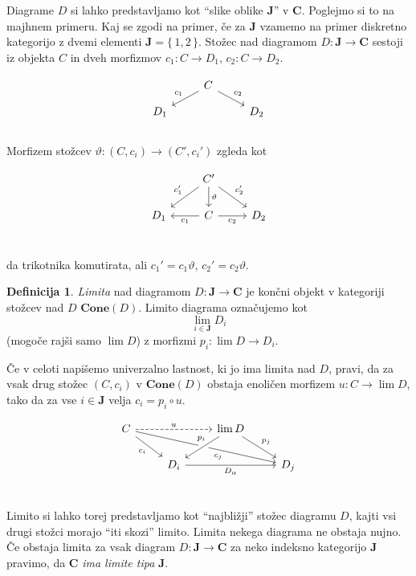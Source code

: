 \documentclass[12pt,a4paper]{book}
\theoremstyle{definition}
\newtheorem{definicija}{Definicija}[chapter]
\theoremstyle{plain}
\theoremstyle{definition}
\theoremstyle{remark}
\newcommand{\cat}[1]{\textbf{#1}}
\renewcommand{\set}[1]{\{\,#1\,\}}
\begin{document}
Diagrame $D$ si lahko predstavljamo kot "`slike oblike $\cat{J}$"' v $\cat{C}$. Poglejmo si to na majhnem primeru. Kaj se zgodi na primer, če za $\cat{J}$ vzamemo na primer diskretno kategorijo z dvemi elementi $\cat{J} = \set{1,2}$. Stožec nad diagramom $D : \cat{J} \to \cat{C}$ sestoji iz objekta $C$ in dveh morfizmov $c_1 : C \to D_1$, $c_2 : C \to D_2$.

$$\begin{tikzcd}[column sep=normal, row sep=small]
& C \ar[dl, "c_1"'] \ar[dr, "c_2"] & \\
D_1 && D_2 \\
\end{tikzcd}$$

Morfizem stožcev $\vartheta : (C,c_i) \to (C', c_i')$ zgleda kot 

$$\begin{tikzcd}
& C' \ar[dl, "c_1'"'] \ar[d, "\vartheta"] \ar[dr, "c_2'"] & \\
D_1 & C \ar[l, "c_1"] \ar[r, "c_2"'] & D_2 \\
\end{tikzcd}$$

da trikotnika komutirata, ali $c_1' = c_1\vartheta$, $c_2' = c_2\vartheta$.

\begin{definicija}
\textit{Limita} nad diagramom $D : \cat{J} \to \cat{C}$ je končni objekt v kategoriji stožcev nad $D$ $\cat{Cone}(D)$. Limito diagrama označujemo kot
$$\lim_{i \in \cat{J}}D_i$$
(mogoče rajši samo $\lim D$)
z morfizmi $p_i : \lim D \to D_i$.


Če v celoti napišemo univerzalno lastnost, ki jo ima limita nad $D$, pravi, da za vsak drug stožec $(C,c_i)$ v $\cat{Cone}(D)$ obstaja enoličen morfizem $u : C \to \lim D$, tako da za vse $i \in \cat{J}$ velja $c_i = p_i \circ u$.

$$\begin{tikzcd}
C \ar[rr, dashed, "u"] \ar[drrr, pos=7/11, "c_j"'] \ar[dr, "c_i"'] & & \lim D \ar[dl, crossing over, pos=1/3, "p_i"'] \ar[dr, "p_j"] \\
& D_i \ar[rr, "D_\alpha"'] & & D_j \\
\end{tikzcd}$$
\end{definicija}

Limito si lahko torej predstavljamo kot "`najbližji"' stožec diagramu $D$, kajti vsi drugi stožci morajo "`iti skozi"' limito. Limita nekega diagrama ne obstaja nujno. Če obstaja limita za vsak diagram $D : \cat{J} \to \cat{C}$ za neko indeksno kategorijo $\cat{J}$ pravimo, da $\cat{C}$ \textit{ima limite tipa} $\cat{J}$.
\end{document}
